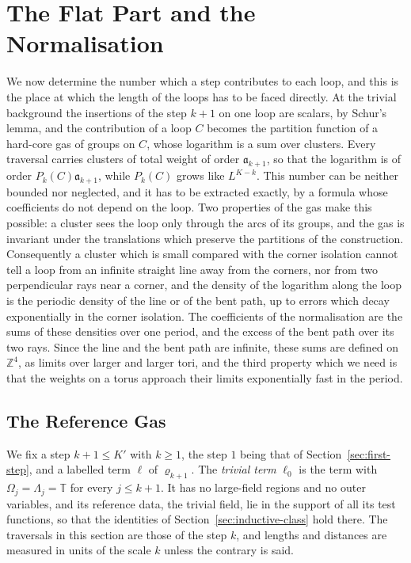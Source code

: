 \documentclass[11pt]{preprint}
\numberwithin{equation}{section}
\theoremstyle{definition}
\theoremstyle{remark}
\theoremstyle{plain}
\begin{document}
\section{The Flat Part and the Normalisation}\label{sec:flat-part}

We now determine the number which a step contributes to each loop, and this is the place at which the length of the loops has to be faced directly. At the trivial background the insertions of the step $k + 1$ on one loop are scalars, by Schur's lemma, and the contribution of a loop $C$ becomes the partition function of a hard-core gas of groups on $C$, whose logarithm is a sum over clusters. Every traversal carries clusters of total weight of order $\mathfrak a_{k+1}$, so that the logarithm is of order $P_k(C)\mathfrak a_{k+1}$, while $P_k(C)$ grows like $L^{K-k}$. This number can be neither bounded nor neglected, and it has to be extracted exactly, by a formula whose coefficients do not depend on the loop. Two properties of the gas make this possible: a cluster sees the loop only through the arcs of its groups, and the gas is invariant under the translations which preserve the partitions of the construction. Consequently a cluster which is small compared with the corner isolation cannot tell a loop from an infinite straight line away from the corners, nor from two perpendicular rays near a corner, and the density of the logarithm along the loop is the periodic density of the line or of the bent path, up to errors which decay exponentially in the corner isolation. The coefficients of the normalisation are the sums of these densities over one period, and the excess of the bent path over its two rays. Since the line and the bent path are infinite, these sums are defined on $\mathbb Z^4$, as limits over larger and larger tori, and the third property which we need is that the weights on a torus approach their limits exponentially fast in the period.

\subsection{The Reference Gas}\label{sec:reference-gas}

We fix a step $k + 1 \leq K'$ with $k \geq 1$, the step $1$ being that of Section~\ref{sec:first-step}, and a labelled term $\ell$ of $\varrho_{k+1}$. The \emph{trivial term} $\ell_0$ is the term with $\Omega_j = \Lambda_j = \mathbb T$ for every $j \leq k + 1$. It has no large-field regions and no outer variables, and its reference data, the trivial field, lie in the support of all its test functions, so that the identities of Section~\ref{sec:inductive-class} hold there. The traversals in this section are those of the step $k$, and lengths and distances are measured in units of the scale $k$ unless the contrary is said.
\end{document}
